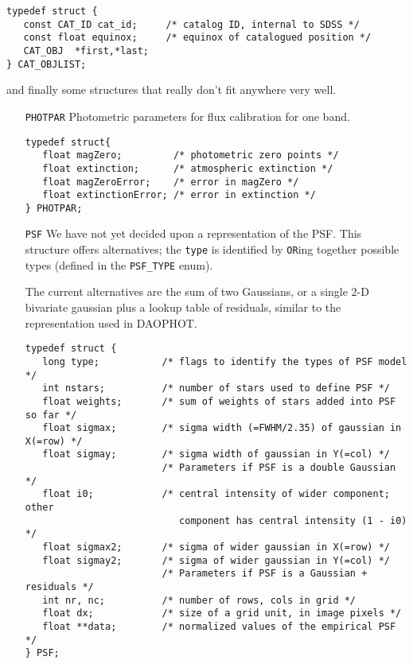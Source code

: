 {\begin{itemize}
\begin{verbatim}
typedef struct {
   const CAT_ID cat_id;     /* catalog ID, internal to SDSS */
   const float equinox;     /* equinox of catalogued position */
   CAT_OBJ  *first,*last;
} CAT_OBJLIST;
\end{verbatim}

\end{itemize}

and finally some structures that really don't fit anywhere very well.

\begin{itemize}

\item[{\tt PHOTPAR}]
 Photometric parameters for flux calibration for one band.

\begin{verbatim}
typedef struct{
   float magZero;         /* photometric zero points */
   float extinction;      /* atmospheric extinction */
   float magZeroError;    /* error in magZero */
   float extinctionError; /* error in extinction */
} PHOTPAR;
\end{verbatim}

\item[{\tt PSF}]
We have not yet decided upon a representation of the PSF. This structure
offers alternatives; the {\tt type} is identified by {\tt OR}ing together
possible types (defined in the {\tt PSF\_TYPE} enum).

The current alternatives are the sum of two Gaussians, or a single
2-D bivariate gaussian plus a lookup table of residuals, similar
to the representation used in DAOPHOT. 

\begin{verbatim}
typedef struct {
   long type;           /* flags to identify the types of PSF model */
   int nstars;          /* number of stars used to define PSF */
   float weights;       /* sum of weights of stars added into PSF so far */
   float sigmax;        /* sigma width (=FWHM/2.35) of gaussian in X(=row) */
   float sigmay;        /* sigma width of gaussian in Y(=col) */
                        /* Parameters if PSF is a double Gaussian */
   float i0;            /* central intensity of wider component; other
                           component has central intensity (1 - i0) */
   float sigmax2;       /* sigma of wider gaussian in X(=row) */
   float sigmay2;       /* sigma of wider gaussian in Y(=col) */
                        /* Parameters if PSF is a Gaussian + residuals */
   int nr, nc;          /* number of rows, cols in grid */
   float dx;            /* size of a grid unit, in image pixels */
   float **data;        /* normalized values of the empirical PSF */
} PSF;
\end{verbatim}


\end{itemize}}
